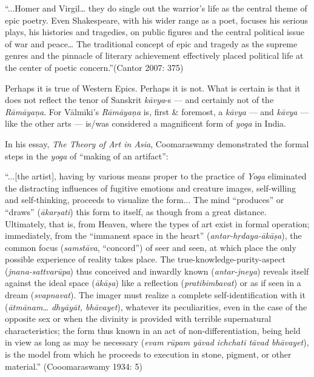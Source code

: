 \begin{myquote}
“...Homer and Virgil… they do single out the warrior’s life as the central theme of epic poetry. Even Shakespeare, with his wider range as a poet, focuses his serious plays, his histories and tragedies, on public figures and the central political issue of war and peace… The traditional concept of epic and tragedy as the supreme genres and the pinnacle of literary achievement effectively placed political life at the center of poetic concern.”\hfill (Cantor 2007: 375)
\end{myquote}

\medskip
Perhaps it is true of Western Epics. Perhaps it is not. What is certain is that it does not reflect the tenor of Sanskrit {\sl kāvya}-s — and certainly not of the {\sl Rāmāyaṇa}. For Vālmīki’s {\sl Rāmāyaṇa} is, first \& foremost, a {\sl kāvya} — and {\sl kāvya} — like the other arts — is/was considered a magnificent form of {\sl yoga} in India. 

\smallskip
In his essay, {\sl The Theory of Art in Asia}, Coomaraswamy demonstrated the formal steps in the {\sl yoga} of “making of an artifact”: 

\smallskip
\begin{myquote}
“...[the artist], having by various means proper to the practice of {\sl Yoga} eliminated the distracting influences of fugitive emotions and creature images, self-willing and self-thinking, proceeds to visualize the form... The mind “produces” or “draws” ({\sl ākarṣati}) this form to itself, as though from a great distance. Ultimately, that is, from Heaven, where the types of art exist in formal operation; immediately, from the “immanent space in the heart” ({\sl antar-hṛdaya-ākāṣa}), the common focus ({\sl samstāva}, “concord”) of seer and seen, at which place the only possible experience of reality takes place. The true-knowledge-purity-aspect ({\sl jnana-sattvarūpa}) thus conceived and inwardly known ({\sl antar-jneya}) reveals itself against the ideal space ({\sl ākāṣa}) like a reflection ({\sl pratibimbavat}) or as if seen in a dream ({\sl svapnavat}). The imager must realize a complete self-identification with it ({\sl ātmānam… dhyāyāt, bhāvayet}), whatever its peculiarities, even in the case of the opposite sex or when the divinity is provided with terrible supernatural characteristics; the form thus known in an act of non-differentiation, being held in view as long as may be necessary ({\sl evam rūpam yāvad ichchati tāvad bhāvayet}), is the model from which he proceeds to execution in stone, pigment, or other material.” 
\hfill (Cooomaraswamy 1934: 5)
\end{myquote}

